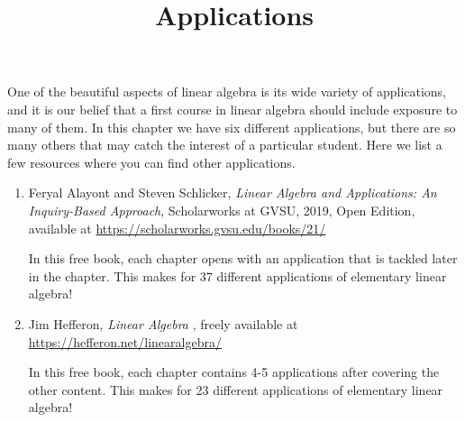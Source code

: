 \documentclass{ximera}
\title{Applications} \license{CC BY-NC-SA 4.0}
\begin{document}
\begin{abstract}

\end{abstract}
\maketitle
 
One of the beautiful aspects of linear algebra is its wide variety of applications, and it is our belief that a first course in linear algebra should include exposure to many of them.  In this chapter we have six different applications, but there are so many others that may catch the interest of a particular student.  Here we list a few resources where you can find other applications.

\begin{enumerate}
    \item Feryal Alayont and Steven Schlicker, \textit{Linear Algebra and Applications: An Inquiry-Based Approach}, Scholarworks at GVSU, 2019, Open Edition, available at \href{https://scholarworks.gvsu.edu/books/21/}{https://scholarworks.gvsu.edu/books/21/}

    In this free book, each chapter opens with an application that is tackled later in the chapter.  This makes for 37 different applications of elementary linear algebra!



    \item
    Jim Hefferon, \textit{Linear Algebra }, freely available at \href{https://hefferon.net/linearalgebra/}{https://hefferon.net/linearalgebra/}

    In this free book, each chapter contains 4-5 applications after covering the other content.  This makes for 23 different applications of elementary linear algebra!

\end{enumerate}

 
\end{document}
